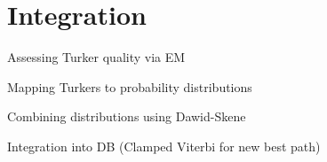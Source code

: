 \section{Integration}

Assessing Turker quality via EM \newline

\noindent Mapping Turkers to probability distributions \newline

\noindent Combining distributions using Dawid-Skene \newline

\noindent Integration into DB (Clamped Viterbi for new best path)





